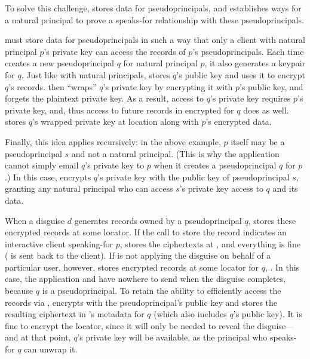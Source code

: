 %
To solve this challenge, \sys stores data for pseudoprincipals,
and establishes ways for a natural principal to prove a speaks-for
relationship with these pseudoprincipals.
%

%
\sys must store data for pseudoprincipals in such a way that only a client
with natural principal $p$'s private key can access the records of $p$'s
pseudoprincipals.
%
%
Each time \sys creates a new pseudoprincipal $q$ for natural principal $p$,
it also generates a keypair for $q$.
%
Just like with natural principals, \sys stores $q$'s public key and uses it
to encrypt $q$'s records.
%
\sys then ``wraps'' $q$'s private key by encrypting it with $p$'s public key,
and forgets the plaintext private key.
%
As a result, access to $q$'s private key requires $p$'s private key, and, thus
access to future records in \sys encrypted for $q$ does as well.
%
\sys stores $q$'s wrapped private key at location  along with
$p$'s encrypted data.
%

%
Finally, this idea applies recursively: in the above example, $p$ itself may
be a pseudoprincipal $s$ and not a natural principal.
%
(This is why the application cannot \eg simply email $q$'s private key to
$p$ when it creates a pseudoprincipal $q$ for $p$.)
%
In this case, \sys encrypts $q$'s private key with the public key of
pseudoprincipal $s$, granting any natural principal who can access
$s$'s private key access to $q$ and its data.
%

%
When a disguise $d$ generates records owned by a pseudoprincipal $q$, \sys stores these encrypted
records at some locator. If the call to store the record indicates an interactive client speaking-for $p$,
\sys stores the ciphertexts at , and everything is fine ( is sent back to the
client).
%
If \sys is not applying the disguise on behalf of a particular user, however, \sys stores encrypted records at some locator for $q$, .
%
In this case, the application and \sys have nowhere to send  when the disguise completes, because $q$ is a
pseudoprincipal.
%
To retain the ability to efficiently access the records via , \sys encrypts 
with the pseudoprincipal's public key and stores the resulting ciphertext in \sys's metadata for $q$
(which also includes $q$'s public key).
%
It is fine to encrypt the locator, since it will only be needed to reveal
the disguise---and at that point, $q$'s private key will be available,
as the principal who speaks-for $q$ can unwrap it.
%

